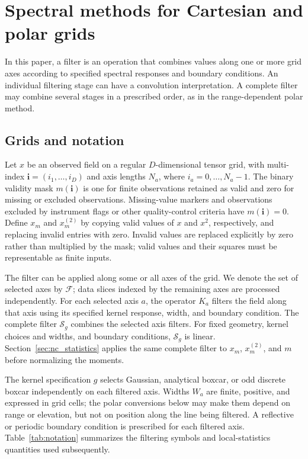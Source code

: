 \documentclass[a4paper,fleqn]{cas-sc}
\begin{document}
\section{Spectral methods for Cartesian and polar grids}
\label{sec:convolution_theorem}

In this paper, a filter is an operation that combines values along one
or more grid axes according to specified spectral responses and
boundary conditions. An individual filtering stage can have a
convolution interpretation. A complete filter may combine several
stages in a prescribed order, as in the range-dependent polar method.

\subsection{Grids and notation}
\label{sec:notation}

Let \(x\) be an observed field on a regular \(D\)-dimensional tensor grid, with multi-index \(\mathbf{i}=(i_1,\ldots,i_D)\) and axis lengths \(N_a\), where \(i_a=0,\ldots,N_a-1\). The binary validity mask \(m(\mathbf{i})\) is one for finite observations retained as valid and zero for missing or excluded observations. Missing-value markers and observations excluded by instrument flags or other quality-control criteria have \(m(\mathbf{i})=0\). Define \(x_m\) and \(x_m^{(2)}\) by copying valid values of \(x\) and \(x^2\), respectively, and replacing invalid entries with zero. Invalid values are replaced explicitly by zero rather than multiplied by the mask; valid values and their squares must be representable as finite inputs.

The filter can be applied along some or all axes of the grid. We denote the set of selected axes by \(\mathcal F\); data slices indexed by the remaining axes are processed independently. For each selected axis \(a\), the operator \(K_a\) filters the field along that axis using its specified kernel response, width, and boundary condition. The complete filter \(\mathcal S_g\) combines the selected axis filters. For fixed geometry, kernel choices and widths, and boundary conditions, \(\mathcal S_g\) is linear. Section~\ref{sec:nc_statistics} applies the same complete filter to \(x_m\), \(x_m^{(2)}\), and \(m\) before normalizing the moments.

The kernel specification $g$ selects Gaussian, analytical boxcar, or odd discrete boxcar independently on each filtered axis. Widths $W_a$ are finite, positive, and expressed in grid cells; the polar conversions below may make them depend on range or elevation, but not on position along the line being filtered. A reflective or periodic boundary condition is prescribed for each filtered axis. Table~\ref{tab:notation} summarizes the filtering symbols and local-statistics quantities used subsequently.
\end{document}
